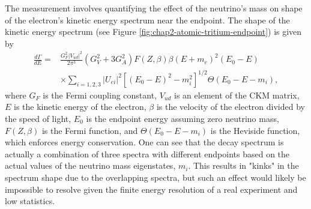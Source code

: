 The measurement involves quantifying the effect of the neutrino's mass on shape of the electron's kinetic energy spectrum near the endpoint. The shape of the kinetic energy spectrum (see Figure \ref{fig:chap2-atomic-tritium-endpoint}) is given by 
\begin{equation}
\begin{split}
    \frac{d\Gamma}{dE}=&\frac{G_F^2|V_{ud}|^2}{2\pi^3}(G_V^2+3G_A^2)F(Z,\beta)\beta(E+m_e)^2(E_0-E)\\
    &\times \sum_{i=1,2,3}{|U_{ei}|^2[(E_0-E)^2-m_i^2]^{1/2}\Theta(E_0-E-m_i)},
\end{split}
\end{equation}
where $G_F$ is the Fermi coupling constant, $V_{ud}$ is an element of the CKM matrix, $E$ is the kinetic energy of the electron, $\beta$ is the velocity of the electron divided by the speed of light, $E_0$ is the endpoint energy assuming zero neutrino mass, $F(Z,\beta)$ is the Fermi function, and $\Theta(E_0-E-m_i)$ is the Heviside function, which enforces energy conservation. One can see that the decay spectrum is actually a combination of three spectra with different endpoints based on the actual values of the neutrino mass eigenstates, $m_i$. This results in "kinks" in the spectrum shape due to the overlapping spectra, but such an effect would likely be impossible to resolve given the finite energy resolution of a real experiment and low statistics. 

